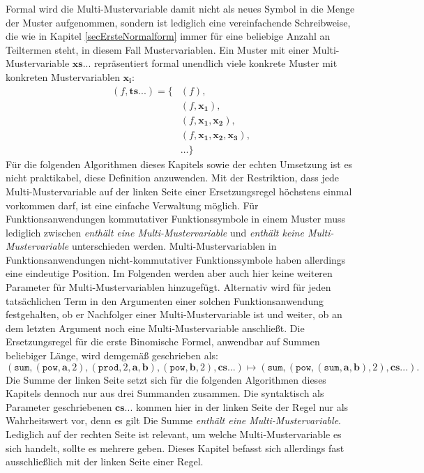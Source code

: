Formal wird die Multi-Mustervariable damit nicht als neues Symbol in die Menge der Muster aufgenommen, sondern ist lediglich eine vereinfachende Schreibweise, die wie in Kapitel \ref{secErsteNormalform} immer für eine beliebige Anzahl an Teiltermen steht, in diesem Fall Mustervariablen. Ein Muster mit einer Multi-Mustervariable $\mathbf{xs...}$ repräsentiert formal unendlich viele konkrete Muster mit konkreten Mustervariablen $\mathbf{x_i}$:
\begin{equation*}
	\begin{split}
			(f, \mathbf{ts...}) = \{&(f), \\
			&(f, \mathbf{x_1}),\\
			&(f, \mathbf{x_1}, \mathbf{x_2}), \\
			&(f, \mathbf{x_1}, \mathbf{x_2}, \mathbf{x_3}), \\
			&\dots \}    		
	\end{split}
\end{equation*}
Für die folgenden Algorithmen dieses Kapitels sowie der echten Umsetzung ist es nicht praktikabel, diese Definition anzuwenden. Mit der Restriktion, dass jede Multi-Mustervariable auf der linken Seite einer Ersetzungsregel höchstens einmal vorkommen darf, ist eine einfache Verwaltung möglich. Für Funktionsanwendungen kommutativer Funktionssymbole in einem Muster muss lediglich zwischen \textit{enthält eine Multi-Mustervariable} und \textit{enthält keine Multi-Mustervariable} unterschieden werden. Multi-Mustervariablen in Funktionsanwendungen nicht-kommutativer Funktionssymbole haben allerdings eine eindeutige Position. Im Folgenden werden aber auch hier keine weiteren Parameter für Multi-Mustervariablen hinzugefügt. Alternativ wird für jeden tatsächlichen Term in den Argumenten einer solchen Funktionsanwendung festgehalten, ob er Nachfolger einer Multi-Mustervariable ist und weiter, ob an dem letzten Argument noch eine Multi-Mustervariable anschließt. 
Die Ersetzungsregel für die erste Binomische Formel, anwendbar auf Summen beliebiger Länge, wird demgemäß  geschrieben als:
$$(\texttt{sum}, (\texttt{pow}, \mathbf a, 2), (\texttt{prod}, 2, \mathbf a, \mathbf b), (\texttt{pow}, \mathbf b, 2), \mathbf{cs...}) \mapsto (\texttt{sum}, (\texttt{pow}, (\texttt{sum}, \mathbf a, \mathbf b), 2), \mathbf{cs...}).$$
Die Summe der linken Seite setzt sich für die folgenden Algorithmen dieses Kapitels dennoch nur aus drei Summanden zusammen. Die syntaktisch als Parameter geschriebenen $\mathbf{cs...}$ kommen hier in der linken Seite der Regel nur als Wahrheitswert vor, denn es gilt \glqq Die Summe \textit{enthält eine Multi-Mustervariable}\grqq{}. Lediglich auf der rechten Seite ist relevant, um welche Multi-Mustervariable es sich handelt, sollte es mehrere geben. Dieses Kapitel befasst sich allerdings fast ausschließlich mit der linken Seite einer Regel.



